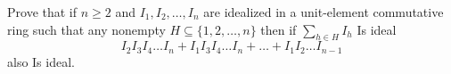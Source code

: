 Prove that if $ n \geq 2 $ and $ I_ {1}, I_ {2}, \ldots, I_ {n} $ are idealized in a unit-element commutative ring such that any nonempty $ H \subseteq \{ 1,2, \dots, n \} $ then if $ \sum_ {h \in H} I_ {h} $ Is ideal
$$
I_ {2} I_ {3} I_ {4} \dots I_ {n} + I_ {1} I_ {3} I_ {4} \dots I_ {n} + \dots + I_ {1} I_ {2} \dots I_ {n-1}
$$also Is ideal.